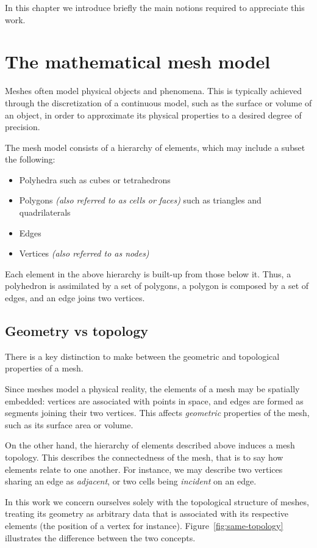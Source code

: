 \newcommand{\imagewidth}{0.8\textwidth}

In this chapter we introduce briefly the main notions required to appreciate this work.

\section{The mathematical mesh model}

Meshes often model physical objects and phenomena. This is typically achieved through the discretization of a continuous model, such as the surface or volume of an object, in order to approximate its physical properties to a desired degree of precision.
\par

The mesh model consists of a hierarchy of elements, which may include a subset the following:
\begin{itemize}
\item Polyhedra such as cubes or tetrahedrons
\item Polygons \emph{(also referred to as cells or faces)} such as triangles and quadrilaterals
\item Edges
\item Vertices \emph{(also referred to as nodes)}
\end{itemize}



Each element in the above hierarchy is built-up from those below it. Thus, a polyhedron is assimilated by a set of polygons, a polygon is composed by a set of edges, and an edge joins two vertices.


\subsection{Geometry vs topology}
There is a key distinction to make between the geometric and topological properties of a mesh.

Since meshes model a physical reality, the elements of a mesh may be spatially embedded: vertices are associated with points in space, and edges are formed as segments joining their two vertices. This affects \emph{geometric} properties of the mesh, such as its surface area or volume.

On the other hand, the hierarchy of elements described above induces a mesh topology. This describes the connectedness of the mesh, that is to say how elements relate to one another. For instance, we may describe two vertices sharing an edge as \emph{adjacent}, or two cells being \emph{incident} on an edge.
\par
In this work we concern ourselves solely with the topological structure of meshes, treating its geometry as arbitrary data that is associated with its respective elements (the position of a vertex for instance). Figure~\ref{fig:same-topology} illustrates the difference between the two concepts.

